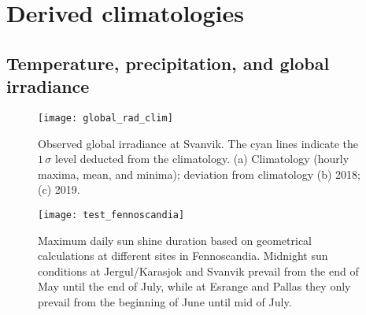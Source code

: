 \documentclass[bg, manuscript]{copernicus}
\begin{document}











\appendix
\section{Derived climatologies}    %

\subsection{Temperature, precipitation, and global irradiance}     %

\appendixfigures  %
\begin{figure*}[t]
  \texttt{[image: global\_rad\_clim]}
  \caption{Observed global irradiance at Svanvik. The cyan lines indicate the $1\,\sigma$ level deducted from the climatology. (a) Climatology (hourly maxima, mean, and minima); deviation from climatology (b) 2018; (c) 2019.}
  \label{fig:global_rad_clim}
\end{figure*}

\begin{figure*}[t]
  \texttt{[image: test\_fennoscandia]}
  \caption{Maximum daily sun shine duration based on geometrical calculations at different sites in Fennoscandia. Midnight sun conditions at Jergul/Karasjok and Svanvik prevail from the end of May until the end of July, while at Esrange and Pallas they only prevail from the beginning of June until mid of July.}
  \label{fig:sunlight_fennoscandia}
\end{figure*}
\end{document}

